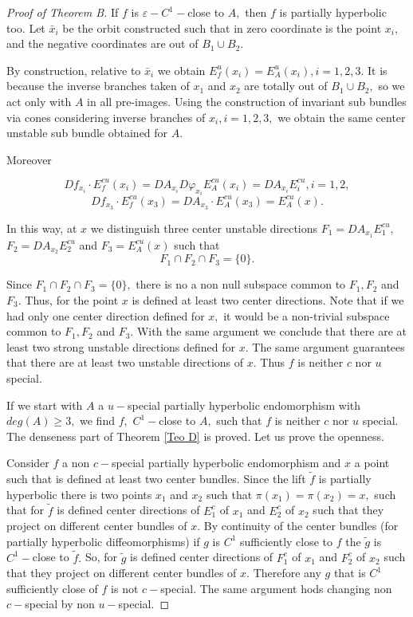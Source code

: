 \documentclass[12pt,reqno]{amsart}
\numberwithin{equation}{section}
\theoremstyle{plain}
\theoremstyle{remark}
\begin{document}
\begin{proof}[Proof of Theorem B]
If $f$ is $\varepsilon-C^1-$close to $A,$ then $f$ is partially hyperbolic too. Let $\bar{x}_i$ be the orbit constructed such that in zero coordinate is the point $x_i,$ and the negative coordinates are out of $B_1 \cup B_2.$

By construction, relative to  $\bar{x}_i$ we obtain $E^u_f(x_i) = E^u_A(x_i), i =1,2,3.$ It is because the inverse branches taken of $x_1$ and $x_2$ are totally out of $B_1 \cup B_2,$ so we act only with $A$ in all pre-images. Using the construction of invariant sub bundles via cones considering inverse branches of $x_i, i=1,2,3,$ we obtain the same center unstable sub bundle obtained for $A.$

 Moreover

$$Df_{x_i} \cdot E^{cu}_f({x_i}) = DA_{x_i}  D\varphi_{x_i} E^{cu}_A(x_i) = DA_{x_i} E^{cu}_i, i = 1,2, $$
$$Df_{x_3} \cdot E^{cu}_f({x_3}) =DA_{x_3}  \cdot E^{cu}_A(x_3) = E^{cu}_A(x). $$

 In this way, at $x$ we distinguish three center unstable directions $F_1 = DA_{x_1} E^{cu}_1,$
 \mbox{$F_2 =DA_{x_2} E^{cu}_2$} and  $F_3 = E^{cu}_A(x) $ such that
 $$F_1 \cap F_2 \cap F_3 = \{0\}. $$

%
%

Since  $F_1 \cap F_2 \cap F_3 = \{0\}, $ there is no a non null subspace common to $F_1, F_2$ and $ F_3 .$ Thus, for the point $x$ is defined at least two center directions.  Note that if we had only one center direction defined for $x,$ it would be a non-trivial subspace common to $F_1,F_2$ and $F_3.$ With the same argument we conclude that there are at least two strong unstable directions defined for $x.$ The same argument guarantees that there are at least two unstable directions of $x.$ Thus $f$ is neither $c$ nor $u$ special.

If we start with $A$ a $u-$special partially hyperbolic endomorphism with $deg(A) \geq 3,$ we find $f,$ $C^1-$close to $A,$ such that $f$  is neither $c$ nor $u$ special.  The denseness part of Theorem \ref{Teo D} is proved. Let us prove the openness.


Consider $f$ a non $c-$special partially hyperbolic endomorphism and $x$ a point such that is defined at least two center bundles. Since the lift $\widetilde{f}$ is partially hyperbolic there is two points $x_1$ and $x_2$ such that $\pi(x_1) = \pi(x_2) = x,$ such that for $\widetilde{f}$ is defined  center directions of   $E^c_1$ of $x_1$ and $E^c_2$ of $x_2$ such that they  project on different center bundles of $x.$ By continuity of the center bundles (for partially hyperbolic diffeomorphisms) if $g$ is  $C^1$ sufficiently close to $f$ the $\widetilde{g}$ is $C^1-$close to $\widetilde{f}.$ So, for $\widetilde{g}$  is defined  center directions of   $F^c_1$ of $x_1$ and $F^c_2$ of $x_2$ such that they  project on different center bundles of $x.$ Therefore any $g$ that is $C^1$  sufficiently close of $f$ is not $c-$special. The same argument hods changing non $c-$special by non $u-$special.



\end{proof}
\end{document}
